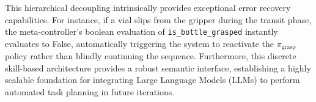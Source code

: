 \documentclass[journal,twocolumn]{IEEEtran}
\begin{document}
This hierarchical decoupling intrinsically provides exceptional error recovery capabilities. For instance, if a vial slips from the gripper during the transit phase, the meta-controller's boolean evaluation of \texttt{is\_bottle\_grasped} instantly evaluates to False, automatically triggering the system to reactivate the $\pi_{\text{grasp}}$ policy rather than blindly continuing the sequence. Furthermore, this discrete skill-based architecture provides a robust semantic interface, establishing a highly scalable foundation for integrating Large Language Models (LLMs) to perform automated task planning in future iterations.
\end{document}
